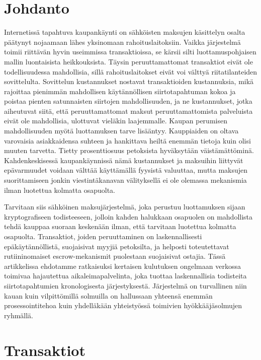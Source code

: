 \documentclass{article}
\begin{document}
\section{Johdanto}
Internetissä tapahtuva kaupankäynti on sähköisten maksujen käsittelyn osalta päätynyt nojaamaan lähes yksinomaan rahoituslaitoksiin. Vaikka järjestelmä toimii riittävän hyvin useimmissa transaktioissa, se kärsii silti luottamuspohjaisen mallin luontaisista heikkouksista. Täysin peruuttamattomat transaktiot eivät ole todellisuudessa mahdollisia, sillä rahoituslaitokset eivät voi välttyä riitatilanteiden sovittelulta. Sovittelun kustannukset nostavat transaktioiden \mbox{kustannuksia}, mikä rajoittaa pienimmän mahdollisen käytännöllisen siirtotapahtuman kokoa ja poistaa pienten satunnaisten siirtojen mahdollisuuden, ja ne kustannukset, jotka aiheutuvat siitä, että peruuttamattomat maksut peruuttamattomista palveluista eivät ole mahdollisia, ulottuvat vieläkin laajemmalle. Kaupan perumisen mahdollisuuden myötä luottamuksen tarve lisääntyy. Kauppiaiden on oltava varovaisia asiakkaidensa suhteen ja hankittava heiltä enemmän tietoja kuin olisi muuten tarvetta. Tietty prosenttiosuus petoksista hyväksytään väistämättöminä. Kahdenkeskisessä kaupankäynnissä nämä kustannukset ja maksuihin liittyvät epävarmuudet voidaan välttää käyttämällä fyysistä valuuttaa, mutta maksujen suorittamiseen jonkin viestintäkanavan vä\-li\-tyk\-sel\-lä  ei ole olemassa mekanismia ilman luotettua kolmatta osapuolta.

Tarvitaan siis sähköinen maksujärjestelmä, joka perustuu luottamuksen sijaan kryptografiseen todisteeseen, jolloin kahden halukkaan osapuolen on mahdollista tehdä kauppaa suoraan keskenään ilman, että tarvitaan luotettua kolmatta osapuolta. Transaktiot, joiden peruuttaminen on laskennallisesti e\-pä\-käy\-tän\-nöl\-lis\-tä, suojaisivat myyjiä petoksilta, ja helposti toteutettavat rutiininomaiset escrow-mekanismit puolestaan suojaisivat ostajia. Tässä artikkelissa ehdotamme ratkaisuksi kertaisen kulutuksen ongelmaan verkossa toimivaa hajautettua aikaleimapalvelinta, joka tuottaa laskennallisia todisteita siirtotapahtumien kronologisesta järjestyksestä. Järjestelmä on turvallinen niin kauan kuin vilpittömillä solmuilla on hallussaan yhteensä enemmän prosessointitehoa kuin yhdelläkään yhteistyössä toimivien hyökkääjäsolmujen ryhmällä.

\section{Transaktiot}
\end{document}
